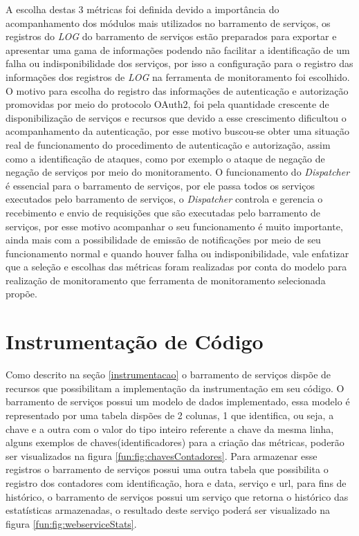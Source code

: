 {A escolha destas 3 métricas foi definida devido a importância do acompanhamento dos módulos mais utilizados no barramento de serviços, os registros do \textit{LOG} do barramento de serviços estão preparados para exportar e apresentar uma gama de informações podendo não facilitar a identificação de um falha ou indisponibilidade dos serviços, por isso a configuração para o registro das informações dos registros de \textit{LOG} na ferramenta de monitoramento foi escolhido. O motivo para escolha do registro das informações de autenticação e autorização promovidas por meio do protocolo OAuth2, foi pela quantidade crescente de disponibilização de serviços e recursos que devido a esse crescimento dificultou o acompanhamento da autenticação, por esse motivo buscou-se obter uma situação real de funcionamento do procedimento de autenticação e autorização, assim como a identificação de ataques, como por exemplo o ataque de negação de negação de serviços por meio do monitoramento. O funcionamento do \textit{Dispatcher} é essencial para o barramento de serviços, por ele passa todos os serviços executados pelo barramento de serviços, o \textit{Dispatcher} controla e gerencia o recebimento e envio de requisições que são executadas pelo barramento de serviços, por esse motivo acompanhar o seu funcionamento é muito importante, ainda mais com a possibilidade de emissão de notificações por meio de seu funcionamento normal e quando houver falha ou indisponibilidade, vale enfatizar que a seleção e escolhas das métricas foram realizadas por conta do modelo para realização de monitoramento que ferramenta de monitoramento selecionada propõe.   


\section{Instrumentação de Código}
\label{instrumentacaoErlangms}

Como descrito na seção \ref{instrumentacao} o barramento de serviços dispõe de recursos que possibilitam a implementação da instrumentação em seu código. O barramento de serviços possui  um modelo de dados implementado, essa modelo é representado por uma tabela dispões de 2 colunas, 1 que identifica, ou seja, a chave e a outra com o valor do tipo inteiro referente a chave da mesma linha, alguns exemplos de chaves(identificadores) para a criação das métricas, poderão ser visualizados na figura \ref{fun:fig:chavesContadores}. Para armazenar esse registros o barramento de serviços possui uma outra tabela que possibilita o registro dos contadores com identificação, hora e data, serviço e url, para fins de histórico, o barramento de serviços possui um serviço que retorna o histórico das estatísticas armazenadas, o resultado deste serviço poderá ser visualizado na figura \ref{fun:fig:webserviceStats}. 

}
